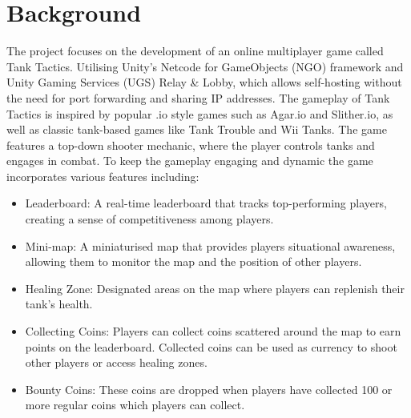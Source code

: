 
\section{Background}
\label{sec:into_back}
The project focuses on the development of an online multiplayer game called Tank Tactics. Utilising Unity's Netcode for GameObjects (NGO) framework and Unity Gaming Services (UGS) Relay \& Lobby, which allows self-hosting without the need for port forwarding and sharing IP addresses. The gameplay of Tank Tactics is inspired by popular .io style games such as Agar.io and Slither.io, as well as classic tank-based games like Tank Trouble and Wii Tanks. The game features a top-down shooter mechanic, where the player controls tanks and engages in combat. To keep the gameplay engaging and dynamic the game incorporates various features including:
\begin{itemize}
    \item Leaderboard: A real-time leaderboard that tracks top-performing players, creating a sense of competitiveness among players.
    \item Mini-map: A miniaturised map that provides players situational awareness, allowing them to monitor the map and the position of other players.
    \item Healing Zone: Designated areas on the map where players can replenish their tank's health.
    \item Collecting Coins: Players can collect coins scattered around the map to earn points on the leaderboard. Collected coins can be used as currency to shoot other players or access healing zones.
    \item Bounty Coins: These coins are dropped when players have collected 100 or more regular coins which players can collect.
\end{itemize}


